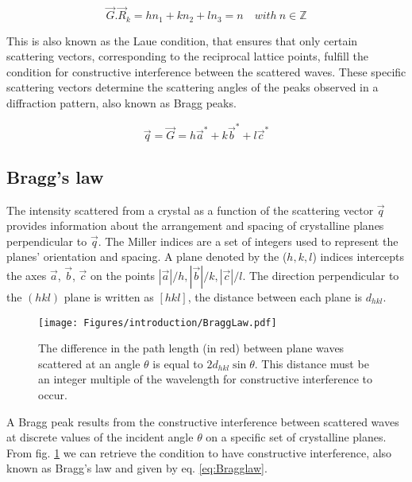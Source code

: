 \begin{equation}
    \label{eq:LaueCond}
    \vec{G} . \vec{R}_k = hn_1 + kn_2 + ln_3 = n \quad  with \ n \in \mathbb{Z}
\end{equation}

This is also known as the Laue condition, that ensures that only certain scattering vectors, corresponding to the reciprocal lattice points, fulfill the condition for constructive interference between the scattered waves.
These specific scattering vectors determine the scattering angles of the peaks observed in a diffraction pattern, also known as Bragg peaks.

\begin{equation}
    \vec{q} = \vec{G}  = h\vec{a}^* + k\vec{b}^* + l\vec{c}^*
\end{equation}

\subsection{Bragg's law}\label{sec:BraggLaw}

The intensity scattered from a crystal as a function of the scattering vector $\vec{q}$ provides information about the arrangement and spacing of crystalline planes perpendicular to $\vec{q}$.
The Miller indices are a set of integers used to represent the planes' orientation and spacing.
A plane denoted by the ($h, k, l$) indices intercepts the axes $\vec{a}$, $\vec{b}$, $\vec{c}$ on the points $|\vec{a}|/h, |\vec{b}|/k, |\vec{c}|/l$.
The direction perpendicular to the $(hkl)$ plane is written as $[hkl]$, the distance between each plane is $d_{hkl}$.

\begin{figure}[!htb]
    \centering
    \texttt{[image: Figures/introduction/BraggLaw.pdf]}
    \caption{
    The difference in the path length (in red) between plane waves scattered at an angle $\theta$ is equal to $2d_{hkl} \sin{\theta}$.
    This distance must be an integer multiple of the wavelength for constructive interference to occur.
    }
    \label{fig:BraggLaw}
\end{figure}

A Bragg peak results from the constructive interference between scattered waves at discrete values of the incident angle $\theta$ on a specific set of crystalline planes.
From fig. \ref{fig:BraggLaw} we can retrieve the condition to have constructive interference, also known as Bragg's law and given by eq. \ref{eq:Bragglaw}.

